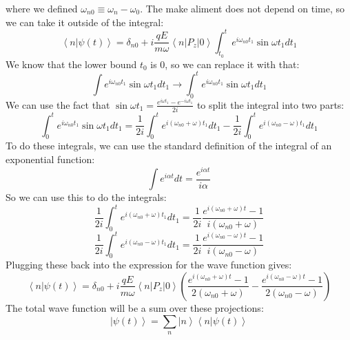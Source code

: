 \documentclass[12pt]{article}
\begin{document}
where we defined $\omega _{n0} \equiv \omega _n - \omega _0$. The make aliment does not depend on time, so we can take it outside of the integral:
\begin{equation}
\left\langle n|\psi(t)\right\rangle = \delta _{n0} +i \frac{q E}{m \omega} \left\langle n\left|P_{z}\right|0\right\rangle \int_{t_0}^t e^{i \omega _{n0} t_1} \sin \omega t_1 d t_1
\end{equation}
We know that the lower bound $t_0$ is 0, so we can replace it with that:
\begin{equation}
\int e^{i \omega _{n0} t_1} \sin \omega t_1 d t_1 \rightarrow \int_0^t e^{i \omega _{n0} t_1} \sin \omega t_1 d t_1
\end{equation}
We can use the fact that $\sin \omega t_1 = \frac{e^{i \omega t_1} - e^{-i \omega t_1}}{2i}$ to split the integral into two parts:
\begin{equation}
\int_0^t e^{i \omega _{n0} t_1} \sin \omega t_1 d t_1 = \frac{1}{2i} \int_0^t e^{i (\omega _{n0} + \omega) t_1} d t_1 - \frac{1}{2i} \int_0^t e^{i (\omega _{n0} - \omega) t_1} d t_1
\end{equation}
To do these integrals, we can use the standard definition of the integral of an exponential function:
\begin{equation}
\int e^{i \alpha t} d t = \frac{e^{i \alpha t}}{i \alpha}
\end{equation}
So we can use this to do the integrals:
\begin{equation}
\frac{1}{2i} \int_0^t e^{i (\omega _{n0} + \omega) t_1} d t_1 = \frac{1}{2i} \frac{e^{i (\omega _{n0} + \omega) t} - 1}{i (\omega _{n0} + \omega)}
\end{equation}
\begin{equation}
\frac{1}{2i} \int_0^t e^{i (\omega _{n0} - \omega) t_1} d t_1 = \frac{1}{2i} \frac{e^{i (\omega _{n0} - \omega) t} - 1}{i (\omega _{n0} - \omega)}
\end{equation}
Plugging these back into the expression for the wave function gives:
\begin{equation}
\left\langle n|\psi(t)\right\rangle = \delta _{n0} +i \frac{q E}{m \omega} \left\langle n\left|P_{z}\right|0\right\rangle \left( \frac{e^{i (\omega _{n0} + \omega) t} - 1}{2 (\omega _{n0} + \omega)} - \frac{e^{i (\omega _{n0} - \omega) t} - 1}{2 (\omega _{n0} - \omega)} \right)
\end{equation}
The total wave function will be a sum over these projections:
\begin{equation}
\left|\psi(t)\right\rangle = \sum _{n} \left|n\right\rangle \left\langle n|\psi(t)\right\rangle
\end{equation}
\end{document}
